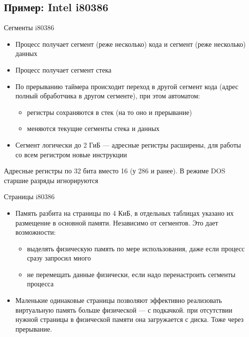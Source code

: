 \documentclass[xetex,aspectratio=43]{beamer}
\begin{document}
\subsection{Пример: Intel i80386}

\begin{frame}{Сегменты i80386}
    \begin{itemize}
        \tightlist
        \item
        Процесс получает сегмент (реже несколько) кода и сегмент (реже
        несколько) данных
        \item
        Процесс получает сегмент стека
        \item
        По прерыванию таймера происходит переход в другой сегмент кода (адрес
        полный обработчика в другом сегменте), при этом автоматом:

        \begin{itemize}
            \tightlist
            \item
            регистры сохраняются в стек (на то оно и прерывание)
            \item
            меняются текущие сегменты стека и данных
        \end{itemize}
        \item
        Сегмент логически до 2 ГиБ --- адресные регистры расширены, для работы
        со всем регистром новые инструкции
    \end{itemize}

    Адресные регистры по 32 бита вместо 16 (у 286 и ранее). В режиме DOS старшие разряды
    игнорируются
\end{frame}

\begin{frame}{Страницы i80386}
    \begin{itemize}
        \tightlist
        \item
        Память разбита на страницы по 4 КиБ, в отдельных таблицах указано их
        размещение в основной памяти. Независимо от сегментов. Это дает
        возможности:

        \begin{itemize}
            \tightlist
            \item
            выделять физическую память по мере использования, даже если процесс
            сразу запросил много
            \item
            не перемещать данные физически, если надо перенастроить сегменты
            процесса
        \end{itemize}
        \item
        Маленькие одинаковые страницы позволяют эффективно реализовать
        виртуальную память больше физической --- с подкачкой. при отсутствии
        нужной страницы в физической памяти она загружается с диска. Тоже
        через прерывание.
    \end{itemize}
\end{frame}
\end{document}
